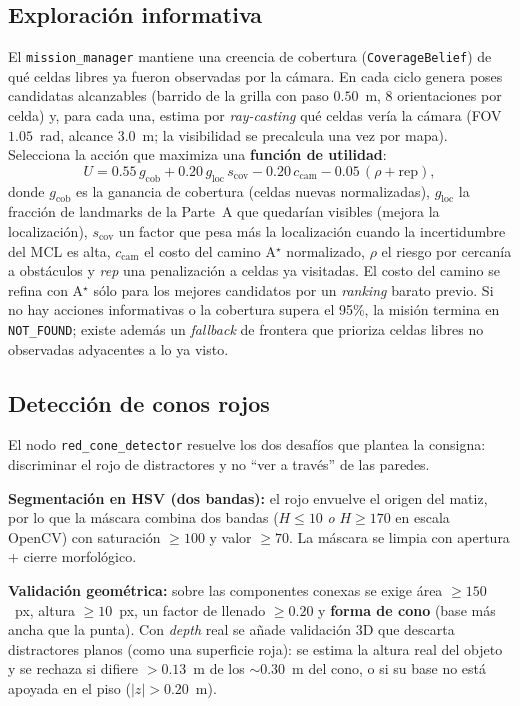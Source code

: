 \subsection{Exploración informativa}
El \texttt{mission\_manager} mantiene una creencia de cobertura (\texttt{CoverageBelief}) de qué celdas libres ya fueron observadas por la cámara. En cada ciclo genera poses candidatas alcanzables (barrido de la grilla con paso $0.50$~m, 8 orientaciones por celda) y, para cada una, estima por \emph{ray-casting} qué celdas vería la cámara (FOV $1.05$~rad, alcance $3.0$~m; la visibilidad se precalcula una vez por mapa). Selecciona la acción que maximiza una \textbf{función de utilidad}:
\begin{equation}
U = 0.55\,g_{\text{cob}} + 0.20\,g_{\text{loc}}\,s_{\text{cov}} - 0.20\,c_{\text{cam}} - 0.05\,(\rho+\text{rep}),
\end{equation}
donde $g_{\text{cob}}$ es la ganancia de cobertura (celdas nuevas normalizadas), $g_{\text{loc}}$ la fracción de landmarks de la Parte~A que quedarían visibles (mejora la localización), $s_{\text{cov}}$ un factor que pesa más la localización cuando la incertidumbre del MCL es alta, $c_{\text{cam}}$ el costo del camino A$^\star$ normalizado, $\rho$ el riesgo por cercanía a obstáculos y \emph{rep} una penalización a celdas ya visitadas. El costo del camino se refina con A$^\star$ sólo para los mejores candidatos por un \emph{ranking} barato previo. Si no hay acciones informativas o la cobertura supera el 95\%, la misión termina en \texttt{NOT\_FOUND}; existe además un \emph{fallback} de frontera que prioriza celdas libres no observadas adyacentes a lo ya visto.

\subsection{Detección de conos rojos}
El nodo \texttt{red\_cone\_detector} resuelve los dos desafíos que plantea la consigna: discriminar el rojo de distractores y no ``ver a través'' de las paredes.

\textbf{Segmentación en HSV (dos bandas):} el rojo envuelve el origen del matiz, por lo que la máscara combina dos bandas ($H\leq 10$ \emph{o} $H\geq 170$ en escala OpenCV) con saturación $\geq 100$ y valor $\geq 70$. La máscara se limpia con apertura + cierre morfológico.

\textbf{Validación geométrica:} sobre las componentes conexas se exige área $\geq 150$~px, altura $\geq 10$~px, un factor de llenado $\geq 0.20$ y \textbf{forma de cono} (base más ancha que la punta). Con \emph{depth} real se añade validación 3D que descarta distractores planos (como una superficie roja): se estima la altura real del objeto y se rechaza si difiere $>0.13$~m de los $\sim$0.30~m del cono, o si su base no está apoyada en el piso ($|z|>0.20$~m).

